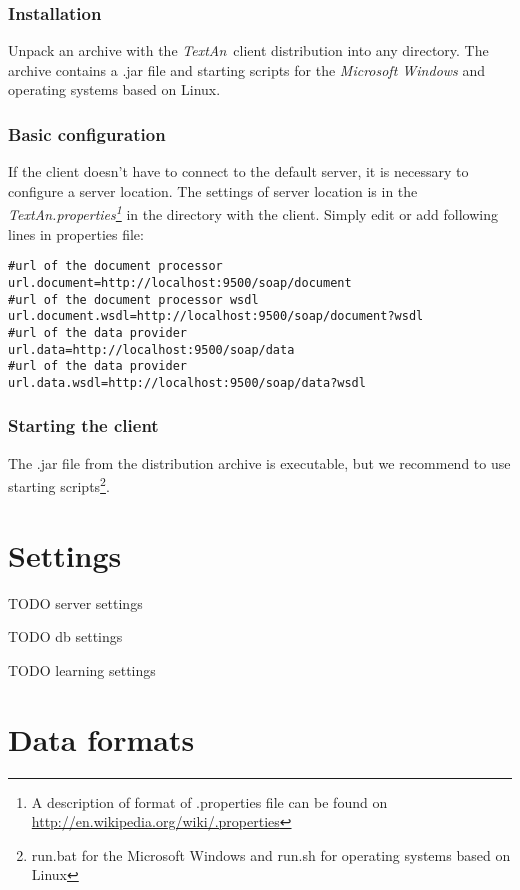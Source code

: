 \documentclass[12pt,a4paper]{report}
\newcommand{\textan}{\emph{TextAn}}
\begin{document}
\subsubsection{Installation}

Unpack an archive with the \textan\ client distribution into any directory. The archive contains a .jar file and starting scripts for the \emph{Microsoft Windows} and operating systems based on Linux.

\subsubsection{Basic configuration}

If the client doesn't have to connect to the default server, it is necessary to configure a server location. The settings of server location is in the \emph{TextAn.properties\footnote{A description of format of .properties file can be found on \url{http://en.wikipedia.org/wiki/.properties}}} in the directory with the client. Simply edit or add following lines in properties file:
\begin{lstlisting}[frame=single,language=properties]
#url of the document processor
url.document=http://localhost:9500/soap/document
#url of the document processor wsdl
url.document.wsdl=http://localhost:9500/soap/document?wsdl
#url of the data provider
url.data=http://localhost:9500/soap/data
#url of the data provider
url.data.wsdl=http://localhost:9500/soap/data?wsdl
\end{lstlisting}

\subsubsection{Starting the client}

The .jar file from the distribution archive is executable, but we recommend to use starting scripts\footnote{run.bat for the Microsoft Windows and run.sh for operating systems based on Linux}.

\section{Settings}
\label{sec:ServerSettings}

TODO server settings

TODO db settings

TODO learning settings

\section{Data formats}
\end{document}

